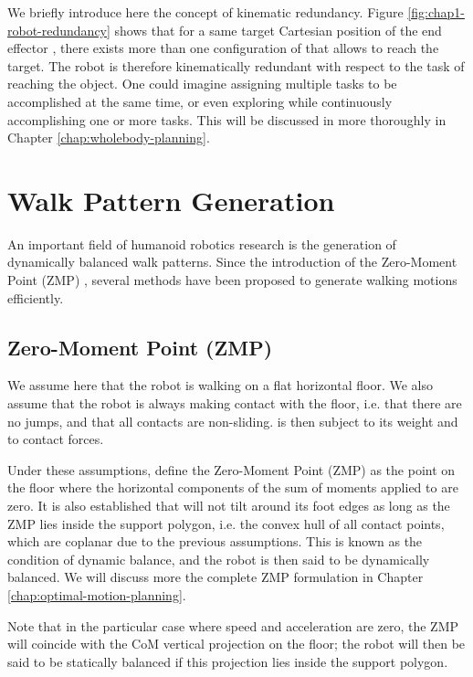 We briefly introduce here the concept of kinematic redundancy. Figure
\ref{fig:chap1-robot-redundancy} shows that for a same target
Cartesian position of the end effector , there exists more
than one configuration of \robot that allows  to reach the
target. The robot \robot is therefore kinematically redundant with
respect to the task of reaching the object. One could imagine
assigning multiple tasks to be accomplished at the same time, or even
exploring \cspace while continuously accomplishing one or more
tasks. This will be discussed in more thoroughly in Chapter
\ref{chap:wholebody-planning}.

\section{Walk Pattern Generation}
\label{sec:chap1-pattern-generator}

An important field of humanoid robotics research is the generation of
dynamically balanced walk patterns. Since the introduction of the
Zero-Moment Point (ZMP) \cite{vukobratovic1969contribution}, several
methods have been proposed to generate walking motions efficiently.

\subsection{Zero-Moment Point (ZMP)}
\label{subsec:chap1-zmp}

We assume here that the robot \robot is walking on a flat horizontal
floor. We also assume that the robot is always making contact with the
floor, i.e. that there are no jumps, and that all contacts are
non-sliding. \robot is then subject to its weight and to contact
forces.

Under these assumptions, \cite{vukobratovic1969contribution} define
the Zero-Moment Point (ZMP) as the point on the floor where the
horizontal components of the sum of moments applied to \robot are
zero. It is also established that \robot will not tilt around its foot
edges as long as the ZMP lies inside the support polygon, i.e. the
convex hull of all contact points, which are coplanar due to the
previous assumptions. This is known as the condition of dynamic
balance, and the robot \robot is then said to be dynamically
balanced. We will discuss more the complete ZMP formulation in Chapter
\ref{chap:optimal-motion-planning}.

Note that in the particular case where speed and acceleration are
zero, the ZMP will coincide with the CoM vertical projection on the
floor; the robot \robot will then be said to be statically balanced if
this projection lies inside the support polygon.

